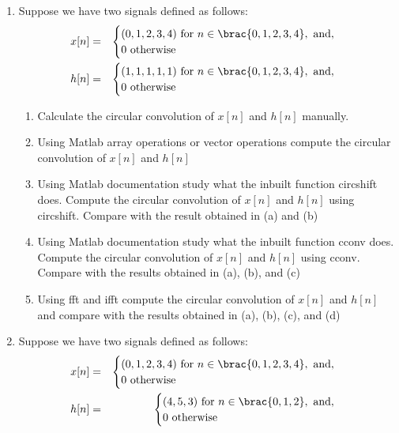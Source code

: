 \begin{enumerate}
\item Suppose we have two signals defined as follows:
  \begin{eqnarray*}
    x[n] & = &
    \begin{cases}
      (0,1,2,3,4) \text{ for } n \in \brac{0,1,2,3,4}, \text{ and}, \\
      0 \text{ otherwise }
    \end{cases}\\
    h[n] & = &
    \begin{cases}
      (1,1,1,1,1) \text{ for } n \in \brac{0,1,2,3,4}, \text{ and}, \\
      0 \text{ otherwise }
    \end{cases}
  \end{eqnarray*}
  \begin{enumerate}
  \item Calculate the circular convolution of $x[n]$ and $h[n]$ manually.
  \item Using Matlab array operations or vector operations compute the circular convolution of $x[n]$ and $h[n]$
  \item Using Matlab documentation study what the inbuilt function circshift does. Compute the circular convolution of $x[n]$ and $h[n]$ using circshift. Compare with the result obtained in (a) and (b)
  \item Using Matlab documentation study what the inbuilt function cconv does. Compute the circular convolution of $x[n]$ and $h[n]$ using cconv. Compare with the results obtained in (a), (b), and (c)
  \item Using fft and ifft compute the circular convolution of $x[n]$ and $h[n]$ and compare with the results obtained in (a), (b), (c), and (d)
  \end{enumerate}
\item Suppose we have two signals defined as follows:
  \begin{eqnarray*}
    x[n] & = &
    \begin{cases}
      (0,1,2,3,4) \text{ for } n \in \brac{0,1,2,3,4}, \text{ and}, \\
      0 \text{ otherwise }
    \end{cases}\\
    h[n] & = &
    \begin{cases}
      (4,5,3) \text{ for } n \in \brac{0,1,2}, \text{ and}, \\
      0 \text{ otherwise }
    \end{cases}
  \end{eqnarray*}

\end{enumerate}
